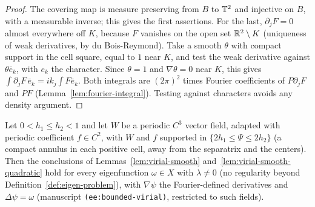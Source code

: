 \begin{proof}
\leanok
The covering map is measure preserving from $B$ to $\mathbb{T}^2$ and injective on $B$, with a
measurable inverse; this gives the first assertions. For the last, $\partial_jF=0$ almost
everywhere off $K$, because $F$ vanishes on the open set $\mathbb{R}^2\setminus K$ (uniqueness of
weak derivatives, by du Bois-Reymond). Take a smooth $\theta$ with compact support in the
cell square, equal to $1$ near $K$, and test the weak derivative against $\theta\bar e_k$,
with $e_k$ the character. Since $\theta=1$ and $\nabla\theta=0$ near $K$, this gives
$\int\partial_jF\,\bar e_k=ik_j\int F\bar e_k$. Both integrals are $(2\pi)^2$ times Fourier
coefficients of $P\partial_jF$ and $PF$ (Lemma~\ref{lem:fourier-integral}). Testing against
characters avoids any density argument.
\end{proof}

\begin{lemma}
\label{lem:virial-l2}
\leanok
Let $0<h_1\le h_2<1$ and let $W$ be a periodic $C^3$ vector field, adapted with periodic
coefficient $f\in C^2$, with $W$ and $f$ supported in $\{2h_1\le\Psi\le2h_2\}$ (a compact
annulus in each positive cell, away from the separatrix and the centers). Then the
conclusions of Lemmas~\ref{lem:virial-smooth} and~\ref{lem:virial-smooth-quadratic} hold
for every eigenfunction $\omega\in X$ with $\lambda\ne0$ (no regularity beyond
Definition~\ref{def:eigen-problem}), with $\nabla\psi$ the Fourier-defined derivatives and
$\Delta\psi=\omega$ (manuscript \texttt{(ee:bounded-virial)}, restricted to such fields).
\end{lemma}


